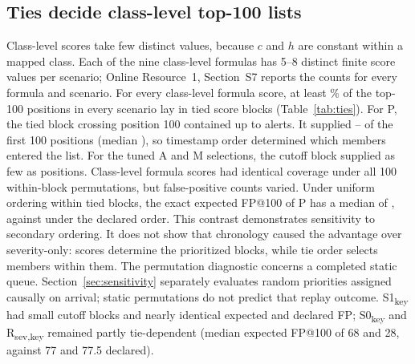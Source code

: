 \documentclass[pdflatex,sn-basic,Numbered]{sn-jnl}
\newcommand{\key}{\textsubscript{key}}
\newcommand{\Rsev}{R\textsubscript{sev,key}}
\begin{document}
\subsection{Ties decide class-level top-100 lists}
\label{subsec:ties}

Class-level scores take few distinct values, because $c$ and $h$ are constant within a mapped class. Each of the nine class-level formulas has 5--8 distinct finite score values per scenario; Online Resource~1, Section~S7 reports the counts for every formula and scenario. For every class-level formula score, at least \TieOrderShareMin\% of the top-100 positions in every scenario lay in tied score blocks (Table~\ref{tab:ties}). For P, the tied block crossing position 100 contained up to \TieBlockMax{} alerts. It supplied \TieCutoffMembersMinP--\TieCutoffMembersMaxP{} of the first 100 positions (median \TieCutoffMembersMedianP), so timestamp order determined which members entered the list. For the tuned A and M selections, the cutoff block supplied as few as \TieCutoffMembersMinClass{} positions. Class-level formula scores had identical coverage under all 100 within-block permutations, but false-positive counts varied. Under uniform ordering within tied blocks, the exact expected FP@100 of P has a median of \TieExpectedFPMedian{}, against \StaticClassFPMedian{} under the declared order. This contrast demonstrates sensitivity to secondary ordering. It does not show that chronology caused the advantage over severity-only: scores determine the prioritized blocks, while tie order selects members within them. The permutation diagnostic concerns a completed static queue. Section~\ref{sec:sensitivity} separately evaluates random priorities assigned causally on arrival; static permutations do not predict that replay outcome. S1\key{} had small cutoff blocks and nearly identical expected and declared FP; S0\key{} and \Rsev{} remained partly tie-dependent (median expected FP@100 of 68 and 28, against 77 and 77.5 declared).

\begin{tableorg}[t]
\centering
\caption{Essential tie diagnostics at $k=100$; all entries are medians over eight scenarios. Cutoff block: size of the tied block crossing rank 100. Selected from block: positions filled from that block. Expected FP: exact expectation under uniform within-block ordering. Online Resource~1, Section~S7 gives the full diagnostic, including tied shares and summed per-scenario coverage extrema; those extrema differ from the aggregate seed ranges in Table~\ref{tab:static}.}
\label{tab:ties}
\small
\unskip
\end{tableorg}
\end{document}
